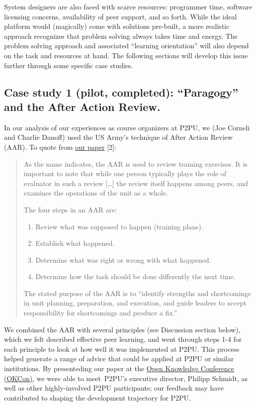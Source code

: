 System designers are also faced with scarce resources: programmer time,
software licensing concerns, availability of peer support, and so forth.
While the ideal platform would (magically) come with solutions
pre-built, a more realistic approach recognizes that problem solving
always takes time and energy. The problem solving approach and
associated ``learning orientation'' will also depend on the task and
resources at hand. The following sections will develop this issue
further through some specific case studies.

\subsection{Case study 1 (pilot, completed): ``Paragogy'' and the After
Action Review.}

In our analysis of our experiences as course organizers at P2PU, we (Joe
Corneli and Charlie Danoff) used the US Army's technique of After Action
Review (AAR). To quote from
\href{http://paragogy.net/ParagogyPaper2}{our paper} {[}2{]}:

\begin{quote}
As the name indicates, the AAR is used to review training exercises. It
is important to note that while one person typically plays the role of
evaluator in such a review {[}\ldots{}{]} the review itself happens
among peers, and examines the operations of the unit as a whole.

The four steps in an AAR are:

\begin{enumerate}
\itemsep1pt\parskip0pt
\item
  Review what was supposed to happen (training plans).
\item
  Establish what happened.
\item
  Determine what was right or wrong with what happened.
\item
  Determine how the task should be done differently the next time.
\end{enumerate}

The stated purpose of the AAR is to ``identify strengths and
shortcomings in unit planning, preparation, and execution, and guide
leaders to accept responsibility for shortcomings and produce a fix.''
\end{quote}

We combined the AAR with several principles (see Discussion section
below), which we felt described effective peer learning, and went
through steps 1-4 for each principle to look at how well it was
implemented at P2PU. This process helped generate a range of advice that
could be applied at P2PU or similar institutions. By presenteding our
paper at the \href{http://okfn.org/okcon/}{Open Knowledge Conference
(OKCon)}, we were able to meet~P2PU's executive director, Philipp
Schmidt, as well as other highly-involved P2PU participants; our
feedback may have contributed to shaping the development trajectory for
P2PU.

